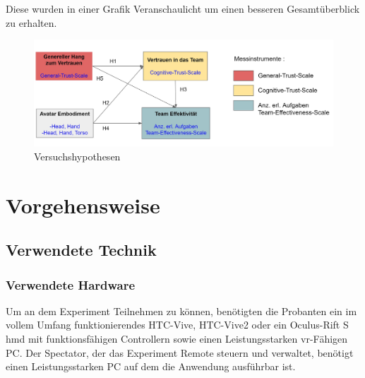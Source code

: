 \documentclass[a4paper,11pt]{article}%
\renewcommand{\\}{\vspace*{0.5\baselineskip} \newline}
\begin{document}
%


Diese wurden in einer Grafik Veranschaulicht um einen besseren Gesamtüberblick zu erhalten.

\begin{figure}[H]
		\begin{footnotesize}
			\includegraphics[width=\textwidth]{Abbildungen/Versuchshypothesen.JPG}\\
			\caption{Versuchshypothesen}
			\label{Versuchshypothesen}
		\end{footnotesize}
	\end{figure}	

		
	\section{Vorgehensweise}
		\subsection{Verwendete Technik}
			\subsubsection{Verwendete Hardware}
Um an dem Experiment Teilnehmen zu können, benötigten die Probanten ein im vollem Umfang funktionierendes HTC-Vive, HTC-Vive2 oder ein Oculus-Rift S \ac{hmd} mit funktionsfähigen Controllern sowie einen Leistungsstarken \ac{vr}-Fähigen PC. Der Spectator, der das Experiment Remote steuern und verwaltet, benötigt einen Leistungsstarken PC auf dem die Anwendung ausführbar ist.
\end{document}
